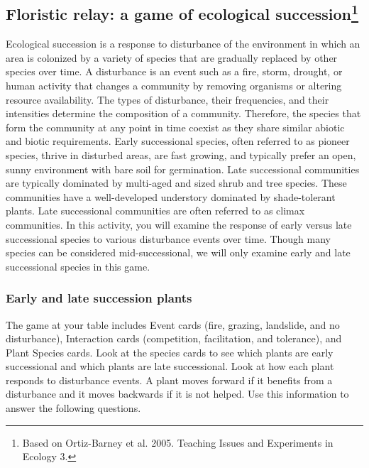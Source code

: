 \documentclass[12pt, hidelinks]{exam}
\begin{document}
\subsection*{Floristic relay: a game of ecological succession\footnote{Based on Ortiz-Barney et al. 2005. Teaching Issues and Experiments in Ecology 3.}}

Ecological succession is a response to disturbance of the environment in which an area is colonized by a variety of species that are gradually replaced by other species over time. A disturbance is an event such as a fire, storm, drought, or human activity that changes a community by removing organisms or altering resource availability. The types of disturbance, their frequencies, and their intensities determine the composition of a community.  Therefore, the species that form the community at any point in time coexist as they share similar abiotic and biotic requirements.  Early successional species, often referred to as pioneer species, thrive in disturbed areas, are fast growing, and typically prefer an open, sunny environment with bare soil for germination. Late successional communities are typically dominated by multi-aged and sized shrub and tree species.  These communities have a well-developed understory  dominated by shade-tolerant plants.  Late successional communities are often referred to as climax communities. In this activity, you will examine the response of early versus late successional species to various disturbance events over time.  Though many species can be considered mid-successional, we will only examine early and late successional species in this game.

\subsubsection*{Early and late succession plants}

The game at your table includes Event cards (fire, grazing, landslide, and no disturbance), Interaction cards (competition, facilitation, and tolerance), and Plant Species cards. Look at the species cards to see which plants are early successional and which plants are late successional. Look 
at how each plant responds to disturbance events. A plant moves forward if it benefits from a disturbance and it moves backwards if it is not helped. Use this information to answer the following questions.
\end{document}
